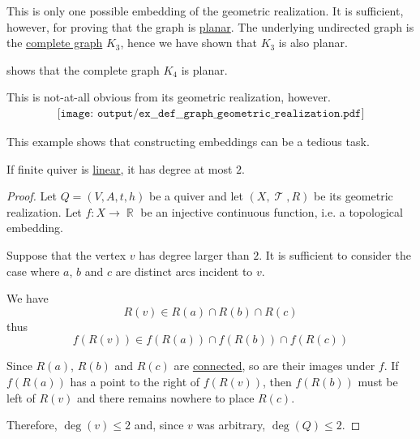 \begin{example}
\begin{thmenum}
    This is only one possible embedding of the geometric realization. It is sufficient, however, for proving that the graph is \hyperref[def:quiver_geometric_realization/planar]{planar}. The underlying undirected graph is the \hyperref[ex:complete_graph]{complete graph} \( K_3 \), hence we have shown that \( K_3 \) is also planar.

      shows that the complete graph \( K_4 \) is planar.

    This is not-at-all obvious from its geometric realization, however.
    \begin{equation}\label{eq:ex:def:quiver_geometric_realization/k4/realization}
      \begin{aligned}
        \texttt{[image: output/ex\_\_def\_\_graph\_geometric\_realization.pdf]}
      \end{aligned}
    \end{equation}

    This example shows that constructing embeddings can be a tedious task.
  \end{thmenum}
\end{example}

\begin{proposition}\label{thm:linear_quiver_equivalence}
  If finite quiver is \hyperref[def:quiver_geometric_realization/linear]{linear}, it has degree at most \( 2 \).
\end{proposition}
\begin{proof}
  Let \( Q = (V, A, t, h) \) be a quiver and let \( (X, \mscrT, R) \) be its geometric realization. Let \( f: X \to \BbbR \) be an injective continuous function, i.e. a topological embedding.

  Suppose that the vertex \( v \) has degree larger than \( 2 \). It is sufficient to consider the case where \( a \), \( b \) and \( c \) are distinct arcs incident to \( v \).

  We have
  \begin{equation*}
    R(v) \in R(a) \cap R(b) \cap R(c)
  \end{equation*}
  thus
  \begin{equation*}
    f(R(v)) \in f(R(a)) \cap f(R(b)) \cap f(R(c))
  \end{equation*}

  Since \( R(a) \), \( R(b) \) and \( R(c) \) are \hyperref[def:connected_space]{connected}, so are their images under \( f \). If \( f(R(a)) \) has a point to the right of \( f(R(v)) \), then \( f(R(b)) \) must be left of \( R(v) \) and there remains nowhere to place \( R(c) \).

  Therefore, \( \deg(v) \leq 2 \) and, since \( v \) was arbitrary, \( \deg(Q) \leq 2 \).
\end{proof}

